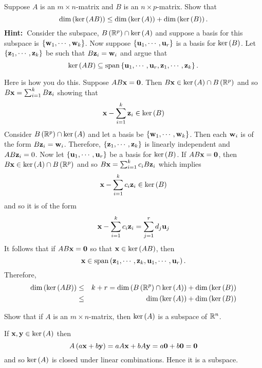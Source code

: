 \begin{enumialphparenastyle}
\begin{ex} Suppose $A$ is an $m\times n$-matrix and $B$ is an $n\times p$-matrix.
Show that 
\begin{equation*}
\dim \left(\ker \left(AB\right) \right) \leq \dim \left(\ker \left(
A\right) \right) +\dim \left(\ker \left(B\right) \right) .
\end{equation*}
\textbf{Hint:\ }Consider the subspace, $B\left(\mathbb{R}^{p}\right) \cap
\ker \left(A\right) $ and suppose a basis for this subspace is $\left\{
\mbox{\bf w}_{1},\cdots ,\mbox{\bf w}_{k}\right\}$. Now suppose $\left\{
\mbox{\bf u}_{1},\cdots ,\mbox{\bf u}_{r}\right\} $ is a basis for $\ker \left(
B\right)$. Let $\left\{\mbox{\bf z}_{1},\cdots ,\mbox{\bf z}_{k}\right\} $ be
such that $B\mbox{\bf z}_{i}=\mbox{\bf w}_{i}$ and argue that 
\begin{equation*}
\ker \tup{AB} \subseteq \sspan\set{\vect{u}_{1},\cdots ,
\vect{u}_{r},\vect{z}_{1},\cdots ,\vect{z}_{k}} .
\end{equation*}
\vspace{1mm}
\begin{sol}
Here is how you do this. Suppose $AB\mbox{\bf x}=\mbox{\bf 0}$. Then $B\mbox{\bf x}\in \ker
\left(A\right) \cap B\left(\mathbb{R}^{p}\right) $ and so $B\mbox{\bf x}
=\sum_{i=1}^{k}B\mbox{\bf z}_{i}$ showing that
\[
\mbox{\bf x}-\sum_{i=1}^{k}\mbox{\bf z}_{i}\in \ker \left(B\right) 
\]
Consider $B\left(\mathbb{R}^{p}\right) \cap \ker \left(A\right) $ and let
a basis be $\left\{\mbox{\bf w}_{1},\cdots ,\mbox{\bf w}_{k}\right\}$. Then
each $\mbox{\bf w}_{i}$ is of the form $B\mbox{\bf z}_{i}=\mbox{\bf w}_{i}$.
Therefore, $\left\{\mbox{\bf z}_{1},\cdots ,\mbox{\bf z}_{k}\right\} $ is
linearly independent and $AB\mbox{\bf z}_{i}=0$. Now let $\left\{\mbox{\bf u}
_{1},\cdots ,\mbox{\bf u}_{r}\right\} $ be a basis for $\ker \left(B\right)$.
If $AB\mbox{\bf x}=\mbox{\bf 0}$, then $B\mbox{\bf x} \in \ker \left(A\right) \cap B\left(
\mathbb{R}^{p}\right) $ and so $B\mbox{\bf x}=\sum_{i=1}^{k}c_{i}B\mbox{\bf z}
_{i}$ which implies
\[
\mbox{\bf x}-\sum_{i=1}^{k}c_{i}\mbox{\bf z}_{i}\in \ker \left(B\right)
\]
and so it is of the form
\[
\mbox{\bf x}-\sum_{i=1}^{k}c_{i}\mbox{\bf z}_{i}=\sum_{j=1}^{r}d_{j}\mbox{\bf u}
_{j}
\]
It follows that if $AB\mbox{\bf x}=\mbox{\bf 0}$ so that $\mbox{\bf x}\in \ker \left(
AB\right)$, then
\[
\vect{x}\in \sspan\tup{\vect{z}_{1},\cdots ,\vect{z}_{k},
\vect{u}_{1},\cdots ,\vect{u}_{r}} .
\]
Therefore,
\begin{eqnarray*}
\dim \left(\ker \left(AB\right) \right)  &\leq &k+r=\dim \left(B\left(
\mathbb{R}^{p}\right) \cap \ker \left(A\right) \right) +\dim \left(\ker
\left(B\right) \right)  \\
&\leq &\dim \left(\ker \left(A\right) \right) +\dim \left(\ker \left(
B\right) \right)
\end{eqnarray*}
\end{sol}
\end{ex}


\begin{ex} Show that if $A$ is an $m\times n$-matrix, then $\ker \left(A\right) $
is a subspace of $\mathbb{R}^n$.
\begin{sol}
If $\mbox{\bf x},\mbox{\bf y}\in \ker \left(A\right) $ then
\[
A\left(a\mbox{\bf x}+b\mbox{\bf y}\right) =aA\mbox{\bf x}+bA\mbox{\bf y}=a\mbox{\bf 0}
+b\mbox{\bf 0}=\mbox{\bf 0}
\]
and so $\ker \left(A\right) $ is closed under linear combinations. Hence it
is a subspace.
\end{sol}
\end{ex}

\end{enumialphparenastyle}
